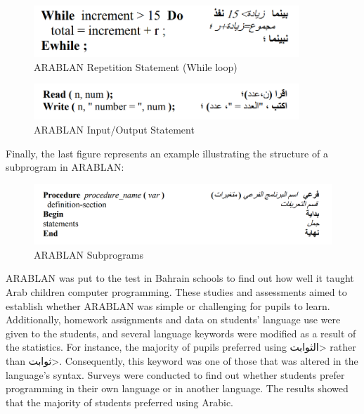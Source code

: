 \begin{figure}[H]
\centering
\includegraphics[width=10cm]{ch2-images/ARABLAN7.png}
\caption{ARABLAN Repetition Statement (While loop) \cite{al2007evaluation}}
\label{fig:ARABLAN Repetition Statement (while loop)}
\end{figure}

\begin{figure}[H]
\centering
\includegraphics[width=10cm]{ch2-images/ARABLAN8.png}
\caption{ARABLAN Input/Output Statement \cite{al2007evaluation}}
\label{fig:ARABLAN Input/Output Statement}
\end{figure}

Finally, the last figure represents an example illustrating the structure of a subprogram in ARABLAN:

\begin{figure}[H]
\centering
\includegraphics[width=15cm]{ch2-images/ARABLAN9.png}
\caption{ARABLAN Subprograms \cite{al2007evaluation}}
\label{fig:ARABLAN Subprograms}
\end{figure}

ARABLAN was put to the test in Bahrain schools to find out how well it taught Arab children computer programming. These studies and assessments aimed to establish whether ARABLAN was simple or challenging for pupils to learn. Additionally, homework assignments and data on students' language use were given to the students, and several language keywords were modified as a result of the statistics. For instance, the majority of pupils preferred using \<الثوابت> rather than \<ثوابت>. Consequently, this keyword was one of those that was altered in the language's syntax. Surveys were conducted to find out whether students prefer programming in their own language or in another language. The results showed that the majority of students preferred using Arabic. 

